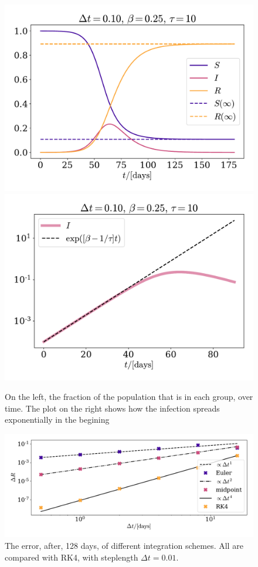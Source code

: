 \documentclass{article}
\begin{document}
    \begin{figure}[H]
        \centering
        \includegraphics[width=.49\textwidth]{../plots/2A/TestSIR}
        \includegraphics[width=.49\textwidth]{../plots/2A/TestI}
        \caption{On the left, the fraction of the population that is in each group, over time. The plot on the right shows how the infection spreads exponentially in the begining}
        \label{SIR}
    \end{figure}

    \begin{figure}[H]
        \centering
        \includegraphics[width=.6\textwidth]{../plots/2A/conv}
        \caption{The error, after, 128 days, of different integration schemes. All are compared with RK4, with steplength $\Delta t = 0.01$.}
        \label{conv det}
    \end{figure}
\end{document}
